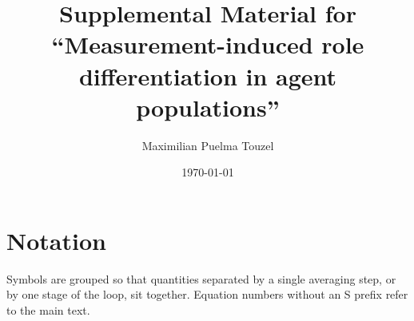 \documentclass[
  aps,prx,
  preprint,
  superscriptaddress,
  nofootinbib
]{revtex4-2}
\begin{document}
\title{Supplemental Material for\\
``Measurement-induced role differentiation in agent populations''}

\author{Maximilian Puelma Touzel}

\date{\today}

\maketitle

\tableofcontents

\bigskip

\section*{Notation}

\noindent Symbols are grouped so that quantities separated by a single averaging step, or by one stage of the loop, sit together. Equation numbers without an S prefix refer to the main text.
\end{document}
